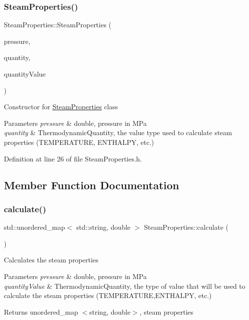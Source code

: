 \subsubsection{\texorpdfstring{Steam\+Properties()}{SteamProperties()}}
{\footnotesize\ttfamily Steam\+Properties\+::\+Steam\+Properties (\begin{DoxyParamCaption}\item[{const double}]{pressure,  }\item[{const \hyperlink{class_steam_properties_ae0294bedf7d178c2d8fb6aed0f62fbff}{Thermodynamic\+Quantity}}]{quantity,  }\item[{const double}]{quantity\+Value }\end{DoxyParamCaption})\hspace{0.3cm}{\ttfamily [inline]}}

Constructor for \hyperlink{class_steam_properties}{Steam\+Properties} class 
\begin{DoxyParams}{Parameters}
{\em pressure} & double, pressure in M\+Pa \\
\hline
{\em quantity} & Thermodynamic\+Quantity, the value type used to calculate steam properties (T\+E\+M\+P\+E\+R\+A\+T\+U\+RE, E\+N\+T\+H\+A\+L\+PY, etc.) \\
\hline
\end{DoxyParams}


Definition at line 26 of file Steam\+Properties.\+h.



\subsection{Member Function Documentation}
\mbox{\label{class_steam_properties_a449e2da87adb5a207bc73ec90f87922a}} 
\subsubsection{\texorpdfstring{calculate()}{calculate()}}
{\footnotesize\ttfamily std\+::unordered\+\_\+map$<$ std\+::string, double $>$ Steam\+Properties\+::calculate (\begin{DoxyParamCaption}{ }\end{DoxyParamCaption})}

Calculates the steam properties


\begin{DoxyParams}{Parameters}
{\em pressure} & double, pressure in M\+Pa \\
\hline
{\em quantity\+Value} & Thermodynamic\+Quantity, the type of value that will be used to calculate the steam properties (T\+E\+M\+P\+E\+R\+A\+T\+U\+RE,E\+N\+T\+H\+A\+L\+PY, etc.)\\
\hline
\end{DoxyParams}
\begin{DoxyReturn}{Returns}
unordered\+\_\+map $<$string, double$>$, steam properties 
\end{DoxyReturn}


